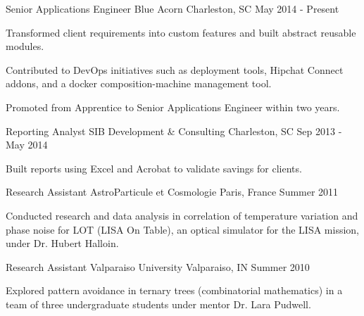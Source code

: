 \begin{cventries}
  \cventry
    {Senior Applications Engineer}
    {Blue Acorn}
    {Charleston, SC}
    {May 2014 - Present}
    {
      \begin{cvitems}
        \item {Transformed client requirements into custom features and built abstract reusable modules.}
        \item {Contributed to DevOps initiatives such as deployment tools, Hipchat Connect addons, and a docker composition-machine management tool.}
        \item {Promoted from Apprentice to Senior Applications Engineer within two years.}
      \end{cvitems}
    }
  \cventry
    {Reporting Analyst}
    {SIB Development \& Consulting}
    {Charleston, SC}
    {Sep 2013 - May 2014}
    {
      \begin{cvitems}
        \item {Built reports using Excel and Acrobat to validate savings for clients.}
      \end{cvitems}
    }
  \cventry
    {Research Assistant}
    {AstroParticule et Cosmologie}
    {Paris, France}
    {Summer 2011}
    {
      \begin{cvitems}
        \item {Conducted research and data analysis in correlation of temperature variation and phase noise for LOT (LISA On Table), an optical simulator for the LISA mission, under Dr. Hubert Halloin.}
      \end{cvitems}
    }
  \cventry
    {Research Assistant}
    {Valparaiso University}
    {Valparaiso, IN}
    {Summer 2010}
    {
      \begin{cvitems}
        \item {Explored pattern avoidance in ternary trees (combinatorial mathematics) in a team of three undergraduate students under mentor Dr. Lara Pudwell.}
      \end{cvitems}
    }
\end{cventries}
